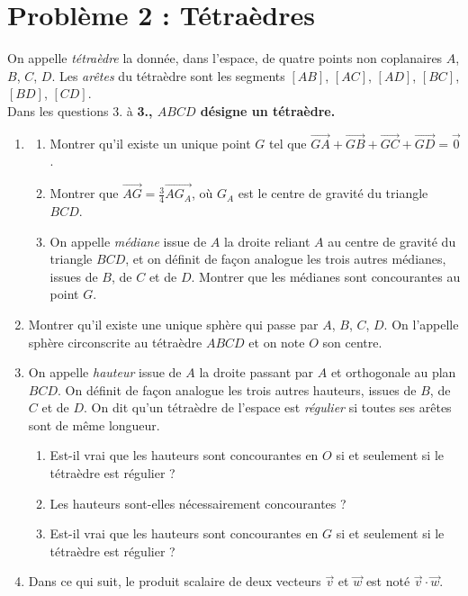 \documentclass[landscape,twocolumn,leqno,a4paper,10pt]{report} %
\newcommand\n{\noindent}
\renewcommand{\textbf}[1]{\begingroup\bfseries\mathversion{bold}#1\endgroup}		%
\begin{document}
\section{Problème 2 : Tétraèdres}

\n On appelle \textit{tétraèdre} la donnée, dans l'espace, de quatre points non coplanaires $A$, $B$, $C$, $D$. Les \textit{arêtes} du tétraèdre sont les segments $[A B]$, $[A C]$, $[A D]$, $[B C]$, $[B D]$, $[C D]$.\\
Dans les questions 3. à \textbf{3.}, $A B C D$ désigne un tétraèdre.

\begin{enumerate}
	\item \begin{enumerate}
		\item Montrer qu'il existe un unique point $G$ tel que $\overrightarrow{G A}+\overrightarrow{G B}+\overrightarrow{G C}+\overrightarrow{G D}=\overrightarrow{0}$.
		\item Montrer que $\overrightarrow{A G}=\frac{3}{4} \overrightarrow{A G_{A}}$, où $G_{A}$ est le centre de gravité du triangle $B C D$.
		\item On appelle \textit{médiane} issue de $A$ la droite reliant $A$ au centre de gravité du triangle $B C D$, et on définit de façon analogue les trois autres médianes, issues de $B$, de $C$ et de $D$. Montrer que les médianes sont concourantes au point $G$.
	\end{enumerate}
	\item Montrer qu'il existe une unique sphère qui passe par $A$, $B$, $C$, $D$. On l'appelle sphère circonscrite au tétraèdre $A B C D$ et on note $O$ son centre.
	\item On appelle \textit{hauteur} issue de $A$ la droite passant par $A$ et orthogonale au plan $B C D$. On définit de façon analogue les trois autres hauteurs, issues de $B$, de $C$ et de $D$. On dit qu'un tétraèdre de l'espace est \textit{régulier} si toutes ses arêtes sont de même longueur.
	\begin{enumerate}
		\item Est-il vrai que les hauteurs sont concourantes en $O$ si et seulement si le tétraèdre est régulier ?
		\item Les hauteurs sont-elles nécessairement concourantes ?
		\item Est-il vrai que les hauteurs sont concourantes en $G$ si et seulement si le tétraèdre est régulier ?
	\end{enumerate}
	\item Dans ce qui suit, le produit scalaire de deux vecteurs $\vec{v}$ et $\vec{w}$ est noté $\vec{v} \cdot \vec{w}$.\\

\end{enumerate}
\end{document}
